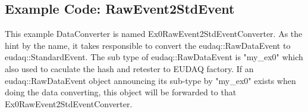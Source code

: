 \subsection{Example Code: RawEvent2StdEvent}\label{sec:Ex0RawEvent2StdEventConverter_cc}
This example DataConverter is named Ex0RawEvent2StdEventConverter. As the hint by the name, it takes responsible to convert the eudaq::RawDataEvent to eudaq::StandardEvent. The sub type of eudaq::RawDataEvent is "my\_ex0" which also used to caculate the hash and retester to EUDAQ factory. If an eudaq::RawDataEvent object announcing its sub-type by "my\_ex0" exists when doing the data converting, this object will be forwarded to that Ex0RawEvent2StdEventConverter.


